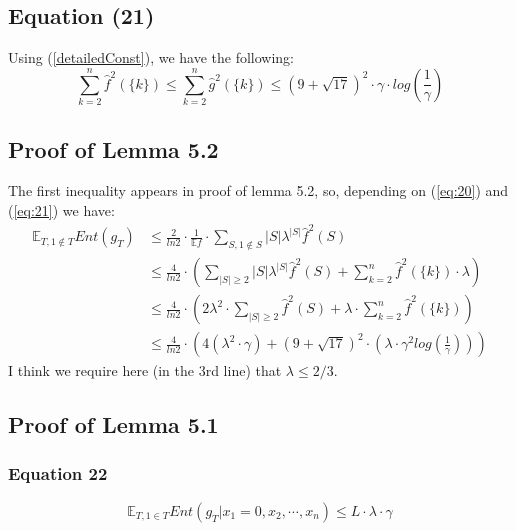 \documentclass{article}
\begin{document}
		\subsection{Equation (21)}
			Using (\ref{detailedConst}), we have the following:
			\begin{equation} \label{eq:21}
				\sum_{k=2}^n \hat{f}^2 \left( \{k\} \right) 
				\leq \sum_{k=2}^n \hat{g}^2 \left( \{k\} \right) 
				\leq \left( 9 + \sqrt{17} \right) ^ 2 \cdot \gamma \cdot log \left( \frac{1}{\gamma} \right)
			\end{equation}
	
		\subsection{Proof of Lemma 5.2}
			The first inequality appears in proof of lemma 5.2, so, depending on (\ref{eq:20}) and (\ref{eq:21}) we have:
			\begin{equation} \label{lemma5:2}\begin{aligned}
				\mathbb{E}_{T, 1 \notin T} Ent(g_T)
				& \leq \frac{2}{ln2} \cdot \frac{1}{\mathbb{E} f} \cdot \sum_{S, 1 \notin S} |S| \lambda^{|S|} \hat{f}^2(S) \\
				& \leq \frac{4}{ln2} \cdot \left( \sum_{|S| \geq 2} |S| \lambda^{|S|} \hat{f}^2(S) + \sum_{k=2}^n \hat{f}^2 \left( \{k\} \right) \cdot \lambda \right) \\
				& \leq \frac{4}{ln2}  \cdot \left( 2 \lambda^2 \cdot \sum_{|S| \geq 2} \hat{f}^2(S) + \lambda \cdot \sum_{k=2}^n \hat{f}^2 \left( \{k\} \right) \right) \\
				& \leq \frac{4}{ln2} \cdot \left( 4 ( \lambda^2 \cdot \gamma ) + \left( 9 + \sqrt{17} \right)^2 \cdot \left( \lambda \cdot \gamma^2 log \left( \frac{1}{\gamma} \right) \right) \right)
			\end{aligned}
			\end{equation}
			I think we require here (in the 3rd line) that $\lambda \leq 2/3$.

		\subsection{Proof of Lemma 5.1}
			\subsubsection{Equation 22}
				\begin{equation}
					\mathbb{E}_{T,1 \in T} Ent \left( g_T | x_1 = 0,x_2, \cdots, x_n \right) \leq L \cdot \lambda \cdot \gamma
			\end{equation}
            
\end{document}
